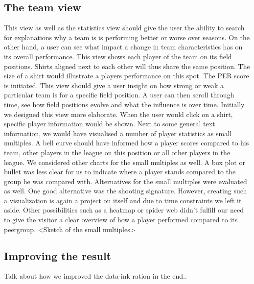 \documentclass{sigchi}
\begin{document}
\subsection{The team view}
This view as well as the statistics view should give the user the ability to search
for explanations why a team is is performing better or worse over seasons. On the 
other hand, a user can see what impact a change in team characteristics has on its
overall performance.
This view shows each player of the team on its field positions. Shirts aligned next to each other will thus share the same position. The size of a shirt would illustrate a players performance on this spot. The PER score is initiated. This view should give
a user insight on how strong or weak a particular team is for a specific field position.
A user can then scroll through time, see how field positions evolve and what the influence is over time.
Initially we designed this view more elaborate. When the user would click on a shirt,
specific player information would be shown. Next to some general text information, 
we would have visualised a number of player statistics as small multiples. A bell curve should have informed how a player scores compared to his team, other players in the league on this position or all other players in the league. We considered other charts for the small multiples as well. A box plot or bullet was less clear for us to indicate where a player stands compared to the group he was compared with. Alternatives for the small multiples were evaluated as well. One good alternative was the shooting signature.\cite{peterbeshai}
However, creating such a visualization is again a project on itself and due to time 
constraints we left it aside. Other possibilities such as a heatmap or spider web didn't fulfill our need to give the visitor a clear overview of how a player performed compared to its peergroup.
<Sketch of the small multiples>

\subsection{Improving the result}
Talk about how we improved the data-ink ration in the end..
\end{document}
